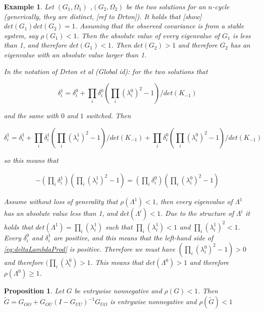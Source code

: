 \documentclass[accepted]{uai2021} %
\newtheorem{exmp}[thm]{Example}
\newtheorem{prop}[thm]{Proposition}
\begin{document}
\begin{exmp}
	Let $(G_1, \Omega_1)$ ,$(G_2, \Omega_2)$ be the two solutions for an 
	$n$-cycle (generically, they are distinct, [ref to Drton]). It holds that 
	[show] $det(G_1)det(G_2) = 1$. Assuming that the observed covariance is 
	from a stable system, say $\rho(G_1) < 1$. Then the absolute value of every 
	eigenvalue of $G_1$ is less than 1, and therefore $det(G_1) < 1$. Then 
	$det(G_2) > 1$ and therefore $G_2$ has an eigenvalue with an absolute value 
	larger than 1.
	
	In the notation of Drton et al (Global id): for the two solutions that 
	
	$$
	\delta_i^1 = \delta_i^0 + \prod_i \delta_i^0 (\prod_i (\lambda_i^0)^2 - 
	1)/det(K_{-1})
	$$
	
	\noindent and the same with $0$ and $1$ switched. Then

	$$
	\delta_i^1 = \delta_i^1 + \prod_i \delta_i^1 (\prod_i (\lambda_i^1)^2 - 
	1)/det(K_{-1}) + \prod_i \delta_i^0 (\prod_i (\lambda_i^0)^2 - 
	1)/det(K_{-1})
	$$	
	
	\noindent so this means that 
	
	\begin{align}
			- (\prod_i \delta_i^1) (\prod_i (\lambda_i^1)^2 - 
			1) = (\prod_i \delta_i^0) (\prod_i (\lambda_i^0)^2 - 
			1)
			\label{eq:deltaLambdaProd}
	\end{align}


	
	\noindent Assume without loss of generality that $\rho(\Lambda^1) < 1$, 
	then every eigenvalue of $\Lambda^1$ has an absolute value less than 1, and 
	$det(\Lambda^i) < 1$. Due to the structure of $\Lambda^i$ it holds that 
	$det(\Lambda^1) = \prod_i(\lambda_i^1)$ such that $\prod_i(\lambda_i^1) < 
	1$ 
	and $\prod_i(\lambda_i^1)^2 < 1$. Every $\delta_i^0$ and $\delta_i^1$ are 
	positive, and this means that the left-hand side of 
	\ref{eq:deltaLambdaProd} is positive. Therefore we must have $(\prod_i 
	(\lambda_i^0)^2 - 
	1) > 0$ and therefore $(\prod_i 
	(\lambda_i^0) > 1$. This means that $det(\Lambda^0) > 1$ and therefore 
	$\rho(\Lambda^0) \geq 1$.
\end{exmp}

\begin{prop}
	Let $G$ be entrywise nonnegative and $\rho(G)<1$. Then $\tilde{G}=G_{OO} + 
	G_{OU}(I-G_{UU})^{-1}G_{UO}$ is entrywise nonnegative and  
	$\rho(\tilde{G})<1$
\end{prop}
\end{document}
